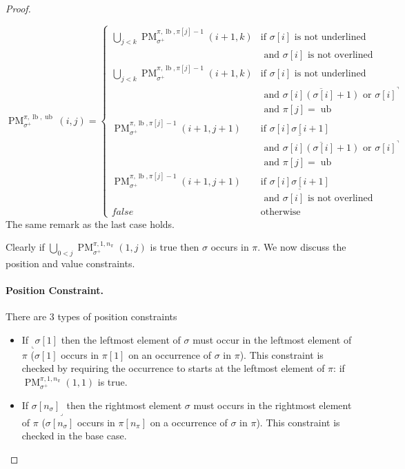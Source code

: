 \documentclass[a4paper]{llncs}
\newcommand{\ptext}{\pi}
\newcommand{\pmotif}{\sigma}
\newcommand{\pbmotif}{\pmotif^+}
\DeclareMathOperator{\PMa}{PM}
\newcommand{\PM}[6]{\PMa_{{#1}}^{{#2},{#3},{#4}}({#5},{#6})}
\DeclareMathOperator{\lb}{lb}
\DeclareMathOperator{\ub}{ub}
\begin{document}
\begin{proof}
\begin{itemize}
	$$
	\PM{\pbmotif}{\ptext}{\lb}{\ub}{i}{j}=
	\begin{cases}
			\bigcup_{j<k} \PM{\pbmotif}{\ptext}{\lb}{\ptext[j]-1}{i+1}{k}
				& \text{if $\pmotif[i]$ is not underlined } \\
				& \text{ and $\pmotif[i]$ is not overlined} \\
			\bigcup_{j<k} \PM{\pbmotif}{\ptext}{\lb}{\ptext[j]-1}{i+1}{k}
				& \text{if $\pmotif[i]$ is not underlined } \\
				& \text{ and $\overline{\pmotif[i](\pmotif[i]+1)}$ or ${\pmotif[i]}^\urcorner$}\\
				& \text{ and $\ptext[j]=\ub$} \\
			\PM{\pbmotif}{\ptext}{\lb}{\ptext[j]-1}{i+1}{j+1}
				& \text{if $\underline{\pmotif[i]\pmotif[i+1]}$ } \\
				& \text{ and $\overline{\pmotif[i](\pmotif[i]+1)}$ or ${\pmotif[i]}^\urcorner$}\\
				& \text{ and $\ptext[j]=\ub$} \\
			\PM{\pbmotif}{\ptext}{\lb}{\ptext[j]-1}{i+1}{j+1}
				& \text{if $\underline{\pmotif[i]\pmotif[i+1]}$ } \\
				& \text{ and $\pmotif[i]$ is not overlined} \\
			false & \text{otherwise}
	\end{cases}
	$$	
	The same remark as the last case holds.

\end{itemize}

Clearly if $\bigcup_{0<j} \PM{\pbmotif}{\ptext}{1}{n_\ptext}{1}{j}$ is true then $\sigma$ occurs in $\pi$. We now discuss the position and value constraints.
\paragraph{Position Constraint.} There are 3 types of position constraints 
\begin{itemize}
	\item If $_\llcorner{\sigma[1]}$ then the leftmost element of $\sigma$  must occur in the leftmost element of $\pi$ ($\pmotif[1]$ occurs in $\ptext[1]$ on an occurrence of $\pmotif$ in $\ptext$). This constraint is checked by requiring the occurrence to starts at the leftmost element of $\ptext$: if  $\PM{\pbmotif}{\ptext}{1}{n_\ptext}{1}{1}$ is true.
	
	\item If ${\pmotif[n_\pmotif]}_\lrcorner$ then the rightmost element $\sigma$ must occurs in the rightmost element of $\pi$ ($\pmotif[n_\pmotif]$ occurs in $\ptext[n_\ptext]$ on a occurrence of $\pmotif$ in $\ptext$). This constraint is checked in the base case.


\end{itemize}
\end{proof}
\end{document}

